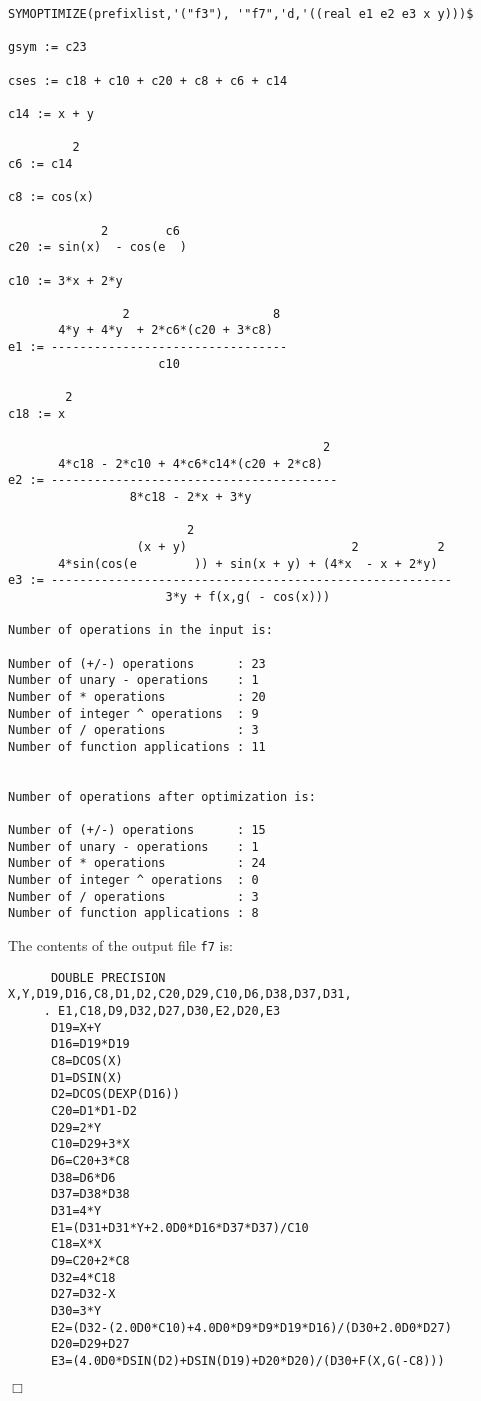 {{\begin{verbatim}
SYMOPTIMIZE(prefixlist,'("f3"), '"f7",'d,'((real e1 e2 e3 x y)))$

gsym := c23

cses := c18 + c10 + c20 + c8 + c6 + c14

c14 := x + y

         2
c6 := c14

c8 := cos(x)

             2        c6
c20 := sin(x)  - cos(e  )

c10 := 3*x + 2*y

                2                    8
       4*y + 4*y  + 2*c6*(c20 + 3*c8)
e1 := ---------------------------------
                     c10

        2
c18 := x

                                            2
       4*c18 - 2*c10 + 4*c6*c14*(c20 + 2*c8)
e2 := ----------------------------------------
                 8*c18 - 2*x + 3*y

                         2
                  (x + y)                       2           2
       4*sin(cos(e        )) + sin(x + y) + (4*x  - x + 2*y)
e3 := --------------------------------------------------------
                      3*y + f(x,g( - cos(x)))

Number of operations in the input is:

Number of (+/-) operations      : 23
Number of unary - operations    : 1
Number of * operations          : 20
Number of integer ^ operations  : 9
Number of / operations          : 3
Number of function applications : 11


Number of operations after optimization is:

Number of (+/-) operations      : 15
Number of unary - operations    : 1
Number of * operations          : 24
Number of integer ^ operations  : 0
Number of / operations          : 3
Number of function applications : 8
\end{verbatim}}

The contents of the output file {\tt f7} is:
{\small
\begin{verbatim}
      DOUBLE PRECISION X,Y,D19,D16,C8,D1,D2,C20,D29,C10,D6,D38,D37,D31,
     . E1,C18,D9,D32,D27,D30,E2,D20,E3
      D19=X+Y
      D16=D19*D19
      C8=DCOS(X)
      D1=DSIN(X)
      D2=DCOS(DEXP(D16))
      C20=D1*D1-D2
      D29=2*Y
      C10=D29+3*X
      D6=C20+3*C8
      D38=D6*D6
      D37=D38*D38
      D31=4*Y
      E1=(D31+D31*Y+2.0D0*D16*D37*D37)/C10
      C18=X*X
      D9=C20+2*C8
      D32=4*C18
      D27=D32-X
      D30=3*Y
      E2=(D32-(2.0D0*C10)+4.0D0*D9*D9*D19*D16)/(D30+2.0D0*D27)
      D20=D29+D27
      E3=(4.0D0*DSIN(D2)+DSIN(D19)+D20*D20)/(D30+F(X,G(-C8)))
\end{verbatim}
\begin{flushright}
$\Box$
\end{flushright}}

}
